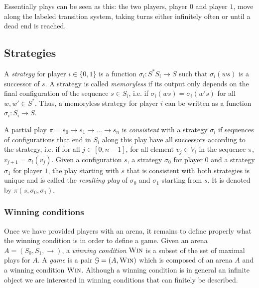 \documentclass[a4paper,UKenglish,cleveref, autoref, thm-restate]{lipics-v2021}
\newcommand{\win}{\textsc{Win}}
\begin{document}
\noindent
Essentially plays can be seen as this: the two players, player $0$ and player $1$, move along the labeled transition system, taking turns either inﬁnitely often or until a dead end is reached.

\subsection{Strategies}


A {\em strategy} for player $i \in \{ 0,1\}$ is a function $\sigma_i : S^* S_i \to S$ such
that $\sigma_i(ws)$ is a successor of $s$.
%
A strategy is called {\em memoryless} if its output only depends on the final configuration of the sequence $s \in S_i$, i.e. if $\sigma_i(ws) = \sigma_i(w's)$ for all $w,w' \in S^*$. Thus, a memoryless strategy for player $i$ can be written  as a function $\sigma_i: S_i \to S$.

A partial play $\pi = s_0 \rightarrow s_1 \rightarrow \ldots \rightarrow s_n$ is {\em consistent} with a strategy $\sigma_i$ if sequences of configurations that end in $S_i$ along this play have all successors according to the strategy, i.e.
if for all $j\in[0,n-1]$, for all element $v_j \in V_i$ in the sequence $\pi$,
$v_{j+1} = \sigma_i(v_j)$.
 Given a configuration $s$,   a strategy $\sigma_0$ for player $0$ and a strategy $\sigma_1$ for player $1$, the play starting with $s$ that is consistent with both strategies is unique and is called the {\em resulting play} of $\sigma_0$ and $\sigma_1$ starting from $s$. It is 
denoted by $\pi(s, \sigma_0, \sigma_1)$.\\






 \subsubsection{Winning conditions}


Once we have provided players with an arena, it remains to define  properly what the winning condition is in order to define a game. Given an arena $A = (S_0, S_1, \rightarrow)$, a {\em winning condition}
$\win$
is a subset  
of the set of maximal plays for $A$. A {\em game} is a pair $\mathcal{G}= (A, \win)$ which is composed of an arena $A$ and a winning condition $\win$.
Although a winning condition is in general an infinite object we are interested in winning conditions 
that can finitely be described.
\end{document}

